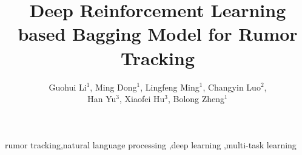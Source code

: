 \documentclass[review]{elsarticle}
\begin{document}
\begin{frontmatter}

\title{Deep Reinforcement Learning based Bagging Model for Rumor Tracking}

\author{Guohui Li$^1$, Ming Dong$^1$, Lingfeng Ming$^1$, Changyin Luo$^2$,\\Han Yu$^3$, Xiaofei Hu$^3$, Bolong Zheng$^1$}
\address{$^1$Huazhong University of Science and Technology, Wuhan, China}
\address{$^2$Central China Normal University, Wuhan, China}
\address{$^3$Wuhan Fiberhome Technical Services Co.,Ltd, Wuhan, China}




\begin{keyword}
rumor tracking\sep natural language processing \sep deep learning \sep multi-task learning
\end{keyword}

\end{frontmatter}

\linenumbers









\end{document}
